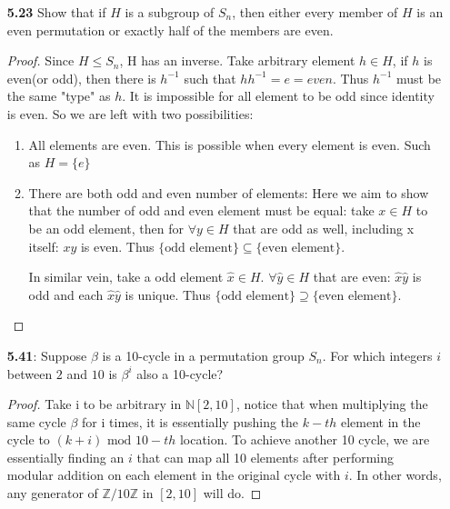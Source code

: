 \documentclass[11pt, oneside]{article}
\newcommand{\N}{\mathbb N}
\newcommand{\Z}{\mathbb Z}
\begin{document}
\begin{enumerate}
\begin{proof}
Assume that $G= \langle g \rangle$ where $g\in G$, then for arbitrary $f\in G$, $f=ax^2+bx +c = g^n$. Then consider the case of $k=ax^2+bx +c+1$. $k\in G$ for obvious reason. Thus $k=g^m$. However since "a" did not change, the difference between m and n must be a multiple of $|a|$. Since $\Z/3Z$ is cyclic, $|a| \in \{1, 3\}$. At the same time $a\neq1$ since if $a=e$, $g$ cannot map all of $G$. Thus $|a|=3$. However, using the same reasoning, $|c|=3$ as well. $g^m= g^n +g^{3x}= ax^2+ \hat{b}x +c \neq ax^2+bx +c+1$. $\Rightarrow\Leftarrow $
\end{proof}
\newpage
\item[{\bf 5.23}] Show that if $H$ is a subgroup of $S_n$, then either every member of $H$ is an even permutation or exactly half of the members are even.
\begin{proof}
Since $H\leq S_n$, H has an inverse. Take arbitrary element $h\in H$, if $h$ is even(or odd), then there is $h^{-1}$ such that $hh^{-1}=e=even$. Thus $h^{-1}$ must be the same "type" as $h$. It is impossible for all element to be odd since identity is even. So we are left with two possibilities:\begin{enumerate}
    \item All elements are even. This is possible when every element is even. Such as $H=\{e\}$
    \item There are both odd and even number of elements: Here we aim to show that the number of odd and even element must be equal: take $x\in H$ to be an odd element, then for $\forall y \in H$ that are odd as well, including x itself: $xy$ is even. Thus $\{\text{odd element}\}\subseteq\{\text{even element}\}$. 
    
    In similar vein, take a odd element $\hat{x}\in H$. $\forall \hat{y}\in H$ that are even: $\hat{x}\hat{y}$ is odd and each $\hat{x}\hat{y}$ is unique. Thus  $\{\text{odd element}\}\supseteq\{\text{even element}\}$. 
\end{enumerate}
\end{proof}
\newpage
\item[{\bf 5.41}:] Suppose $\beta$ is a 10-cycle in a permutation group $S_n$. For which integers $i$ between $2$ and $10$ is $\beta^i$ also a 10-cycle?
\begin{proof}
Take i to be arbitrary in $\N[2,10]$, notice that when multiplying the same cycle $\beta$ for i times, it is essentially pushing the $k-th$ element in the cycle to $(k+i) \text{ mod } 10 -th$ location. To achieve another 10 cycle, we are essentially finding an $i$ that can map all 10 elements after performing modular addition on each element in the original cycle with $i$. In other words, any generator of $\Z/10\Z$ in $[2,10]$ will do. 


\end{proof}
\end{enumerate}
\end{document}
